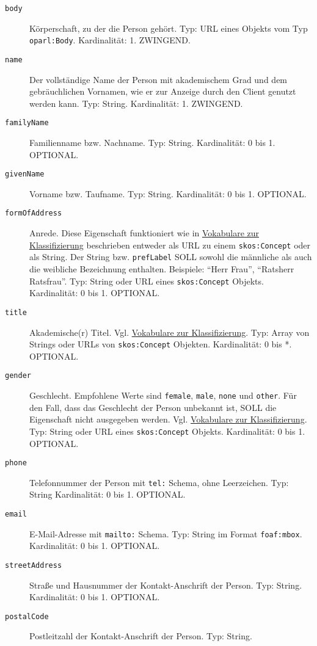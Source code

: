 \documentclass[,a4paper]{article}
\begin{document}
\begin{description}
\item[\texttt{body}]
Körperschaft, zu der die Person gehört. Typ: URL eines Objekts vom Typ
\texttt{oparl:Body}. Kardinalität: 1. ZWINGEND.
\item[\texttt{name}]
Der vollständige Name der Person mit akademischem Grad und dem
gebräuchlichen Vornamen, wie er zur Anzeige durch den Client genutzt
werden kann. Typ: String. Kardinalität: 1. ZWINGEND.
\item[\texttt{familyName}]
Familienname bzw. Nachname. Typ: String. Kardinalität: 0 bis 1.
OPTIONAL.
\item[\texttt{givenName}]
Vorname bzw. Taufname. Typ: String. Kardinalität: 0 bis 1. OPTIONAL.
\item[\texttt{formOfAddress}]
Anrede. Diese Eigenschaft funktioniert wie in
\hyperref[vokabulareux5fklassifizierung]{Vokabulare zur Klassifizierung}
beschrieben entweder als URL zu einem \texttt{skos:Concept} oder als
String. Der String bzw. \texttt{prefLabel} SOLL sowohl die männliche als
auch die weibliche Bezeichnung enthalten. Beispiele: ``Herr \textbar{}
Frau'', ``Ratsherr \textbar{} Ratsfrau''. Typ: String oder URL eines
\texttt{skos:Concept} Objekts. Kardinalität: 0 bis 1. OPTIONAL.
\item[\texttt{title}]
Akademische(r) Titel. Vgl.
\hyperref[vokabulareux5fklassifizierung]{Vokabulare zur
Klassifizierung}. Typ: Array von Strings oder URLs von
\texttt{skos:Concept} Objekten. Kardinalität: 0 bis *. OPTIONAL.
\item[\texttt{gender}]
Geschlecht. Empfohlene Werte sind \texttt{female}, \texttt{male},
\texttt{none} und \texttt{other}. Für den Fall, dass das Geschlecht der
Person unbekannt ist, SOLL die Eigenschaft nicht ausgegeben werden. Vgl.
\hyperref[vokabulareux5fklassifizierung]{Vokabulare zur
Klassifizierung}. Typ: String oder URL eines \texttt{skos:Concept}
Objekts. Kardinalität: 0 bis 1. OPTIONAL.
\item[\texttt{phone}]
Telefonnummer der Person mit \texttt{tel:} Schema, ohne Leerzeichen.
Typ: String Kardinalität: 0 bis 1. OPTIONAL.
\item[\texttt{email}]
E-Mail-Adresse mit \texttt{mailto:} Schema. Typ: String im Format
\texttt{foaf:mbox}. Kardinalität: 0 bis 1. OPTIONAL.
\item[\texttt{streetAddress}]
Straße und Hausnummer der Kontakt-Anschrift der Person. Typ: String.
Kardinalität: 0 bis 1. OPTIONAL.
\item[\texttt{postalCode}]
Postleitzahl der Kontakt-Anschrift der Person. Typ: String.

\end{description}
\end{document}
